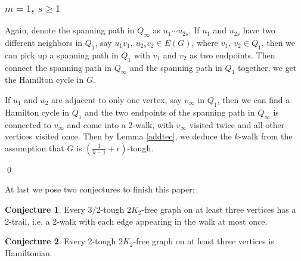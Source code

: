 \documentclass{amsart}
\theoremstyle{definition}
\newtheorem{conjecture}{Conjecture}
\begin{document}
\subsubsection{$m=1$, $s\ge1$}

Again, denote the spanning path in $Q_{\infty}$ as $u_1\cdots u_{2s}$.
If $u_1$ and $u_{2s}$ have two different neighbors in $Q_1$, say $u_1v_1,~u_{2s}v_2\in E(G)$, where $v_1,~v_2\in Q_1$, then we can pick up a spanning path in $Q_1$ with $v_1$ and $v_2$ as two endpoints. Then connect the spanning path in $Q_{\infty}$ and the spanning path in $Q_1$ together, we get the Hamilton cycle in $G$.

If $u_1$ and $u_2$ are adjacent to only one vertex, say $v_{\infty}$ in $Q_1$, then we can find a Hamilton cycle in $Q_1$ and the two endpoints of the spanning path in $Q_{\infty}$ is connected to $v_{\infty}$ and come into a 2-walk, with $v_{\infty}$ visited twice and all other vertices visited once. Then by Lemma \ref{addtec}, we deduce the $k$-walk from the assumption that $G$ is $(\frac{1}{k-1}+\epsilon)$-tough.







\qed



At last we pose two conjectures to finish this paper:


\begin{conjecture}
Every $3/2$-tough $2K_2$-free graph on at least three vertices has a 2-trail, i.e. a 2-walk with each edge appearing in the walk at most once.
\end{conjecture}


\begin{conjecture}
Every 2-tough $2K_2$-free graph on at least three vertices is Hamiltonian.
\end{conjecture}



























\end{document}
